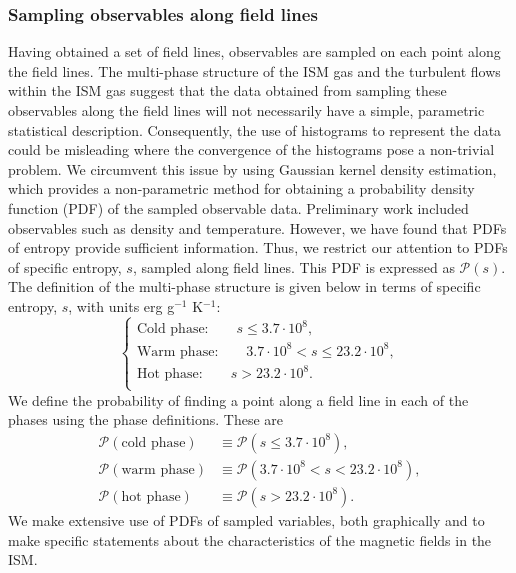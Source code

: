 \documentclass[useAMS,usenatbib]{mn2e}
\begin{document}
\subsubsection{Sampling observables along field lines}
Having obtained a set of field lines, observables are sampled on each point along the field lines. The multi-phase structure of the ISM gas and the turbulent flows within the ISM gas suggest that the data obtained from sampling these observables along the field lines will not necessarily have a simple, parametric statistical description. Consequently, the use of histograms to represent the data could be misleading where the convergence of the histograms pose a non-trivial problem. We circumvent this issue by using Gaussian kernel density estimation, which provides a non-parametric method for obtaining a probability density function (PDF) of the sampled observable data. Preliminary work included observables such as density and temperature. However, we have found that PDFs of entropy provide sufficient information. Thus, we restrict our attention to PDFs of specific entropy, $s$, sampled along field lines. This PDF is expressed as $\mathcal{P}(s)$. The definition of the multi-phase structure is given below in terms of specific entropy, $s$, with units erg g$^{-1}$ K$^{-1}$:
\begin{equation}
\begin{cases}
\text{Cold phase:}\qquad s\leq3.7\cdot10^8,\\
\text{Warm phase:}\qquad 3.7\cdot10^8<s\leq23.2\cdot10^8,\\
\text{Hot phase:}\qquad s>23.2\cdot10^8.\\
\end{cases}
\label{phase_defns}
\end{equation} 
We define the probability of finding a point along a field line in each of the phases using the phase definitions. These are
\begin{align}
\mathcal P(\text{cold phase})&\equiv\mathcal P(s\leq3.7\cdot10^8),\nonumber\\
\mathcal P(\text{warm phase})&\equiv\mathcal P(3.7\cdot10^8<s<23.2\cdot10^8),\\
\mathcal P(\text{hot phase})&\equiv\mathcal P(s>23.2\cdot10^8).\nonumber
\end{align}
We make extensive use of PDFs of sampled variables, both graphically and to make specific statements about the characteristics of the magnetic fields in the ISM.
\end{document}
